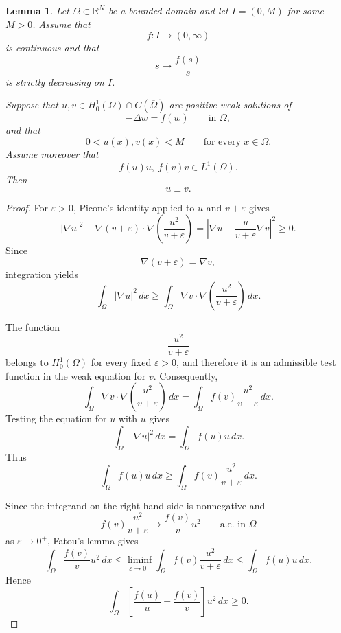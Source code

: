 \documentclass[11pt]{article}
\newtheorem{lemma}[theorem]{Lemma}
\theoremstyle{definition}
\begin{document}
\begin{lemma}
\label{lem:picone-comparison}
Let $\Omega\subset\mathbb R^N$ be a bounded domain and let
$I=(0,M)$ for some $M>0$. Assume that
\[
f:I\longrightarrow(0,\infty)
\]
is continuous and that
\[
s\longmapsto\frac{f(s)}{s}
\]
is strictly decreasing on $I$.

Suppose that $u,v\in H_0^1(\Omega)\cap C(\overline\Omega)$ are
positive weak solutions of
\[
-\Delta w=f(w)
\qquad\text{in }\Omega,
\]
and that
\[
0<u(x),v(x)<M
\qquad\text{for every }x\in\Omega.
\]
Assume moreover that
\[
f(u)u,\ f(v)v\in L^1(\Omega).
\]
Then
\[
u\equiv v.
\]
\end{lemma}

\begin{proof}
For $\varepsilon>0$, Picone's identity applied to $u$ and
$v+\varepsilon$ gives
\[
|\nabla u|^2
-
\nabla(v+\varepsilon)\cdot
\nabla\left(\frac{u^2}{v+\varepsilon}\right)
=
\left|
\nabla u-
\frac{u}{v+\varepsilon}\nabla v
\right|^2
\geq0.
\]
Since
\[
\nabla(v+\varepsilon)=\nabla v,
\]
integration yields
\begin{equation}
\label{eq:picone-eps-1}
\int_\Omega |\nabla u|^2\,dx
\geq
\int_\Omega
\nabla v\cdot
\nabla\left(\frac{u^2}{v+\varepsilon}\right)\,dx.
\end{equation}

The function
\[
\frac{u^2}{v+\varepsilon}
\]
belongs to $H_0^1(\Omega)$ for every fixed $\varepsilon>0$, and
therefore it is an admissible test function in the weak equation for
$v$. Consequently,
\[
\int_\Omega
\nabla v\cdot
\nabla\left(\frac{u^2}{v+\varepsilon}\right)\,dx
=
\int_\Omega
f(v)\frac{u^2}{v+\varepsilon}\,dx.
\]
Testing the equation for $u$ with $u$ gives
\[
\int_\Omega|\nabla u|^2\,dx
=
\int_\Omega f(u)u\,dx.
\]
Thus
\begin{equation}
\label{eq:picone-eps-2}
\int_\Omega f(u)u\,dx
\geq
\int_\Omega
f(v)\frac{u^2}{v+\varepsilon}\,dx.
\end{equation}

Since the integrand on the right-hand side is nonnegative and
\[
f(v)\frac{u^2}{v+\varepsilon}
\longrightarrow
\frac{f(v)}{v}u^2
\qquad\text{a.e. in }\Omega
\]
as $\varepsilon\to0^+$, Fatou's lemma gives
\[
\int_\Omega
\frac{f(v)}{v}u^2\,dx
\leq
\liminf_{\varepsilon\to0^+}
\int_\Omega
f(v)\frac{u^2}{v+\varepsilon}\,dx
\leq
\int_\Omega f(u)u\,dx.
\]
Hence
\begin{equation}
\label{eq:picone-limit-1}
\int_\Omega
\left[
\frac{f(u)}{u}
-
\frac{f(v)}{v}
\right]u^2\,dx
\geq0.
\end{equation}


\end{proof}
\end{document}
